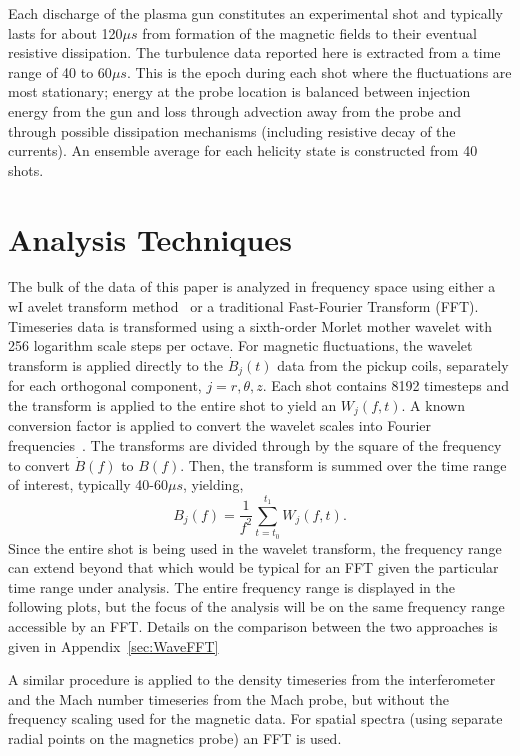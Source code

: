 \documentclass[preprint2]{aastex}
\begin{document}
Each discharge of the plasma gun constitutes an experimental shot and typically lasts for about 120$\mu s$ from formation of the magnetic fields to their eventual resistive dissipation. The turbulence data reported here is extracted from a time range of 40 to 60$\mu s$. This is the epoch during each shot where the fluctuations are most stationary; energy at the probe location is balanced between injection energy from the gun and loss through advection away from the probe and through possible dissipation mechanisms (including resistive decay of the currents). An ensemble average for each helicity state is constructed from 40 shots.

\section{Analysis Techniques}\label{sec:analysis}

The bulk of the data of this paper is analyzed in frequency space using either a wI avelet transform method~\citep{tor98} or a traditional Fast-Fourier Transform (FFT). Timeseries data is transformed using a sixth-order Morlet mother wavelet with 256 logarithm scale steps per octave. For magnetic fluctuations, the wavelet transform is applied directly to the $\dot{B}_{j}(t)$ data from the pickup coils, separately for each orthogonal component, $j = r,\theta,z$. Each shot contains 8192 timesteps and the transform is applied to the entire shot to yield an $W_{j}(f,t)$. A known conversion factor is applied to convert the wavelet scales into Fourier frequencies~\citep{tor98}. The transforms are divided through by the square of the frequency to convert $\dot{B}(f)$ to $B(f)$. Then, the transform is summed over the time range of interest, typically 40-60$\mu s$, yielding,
\begin{equation}
B_{j}(f) = \frac{1}{f^{2}}\sum_{t=t_{0}}^{t_{1}} W_{j}(f,t).
\label{eq:wavelet_transform}
\end{equation}
%
Since the entire shot is being used in the wavelet transform, the frequency range can extend beyond that which would be typical for an FFT given the particular time range under analysis. The entire frequency range is displayed in the following plots, but the focus of the analysis will be on the same frequency range accessible by an FFT. Details on the comparison between the two approaches is given in Appendix~\ref{sec:WaveFFT}

A similar procedure is applied to the density timeseries from the interferometer and the Mach number timeseries from the Mach probe, but without the frequency scaling used for the magnetic data. For spatial spectra (using separate radial points on the magnetics probe) an FFT is used.
\end{document}
